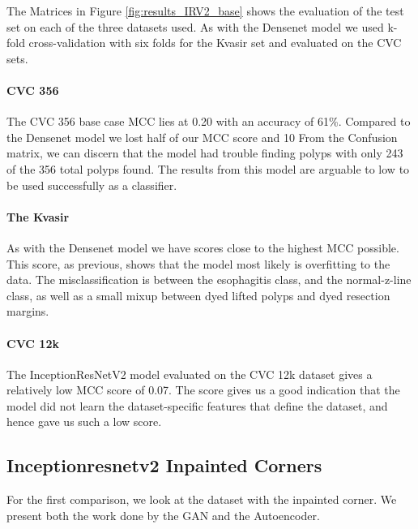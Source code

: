 \noindent
The Matrices in Figure \ref{fig:results_IRV2_base} shows the evaluation of the test set on each of the three datasets used. 
As with the Densenet model we used k-fold cross-validation with six folds for the Kvasir set and evaluated on the CVC sets.

\paragraph{CVC 356}
The CVC 356 base case MCC lies at 0.20 with an accuracy of 61\%.
Compared to the Densenet model we lost half of our MCC score and 10%
From the Confusion matrix, we can discern that the model had trouble finding polyps with only 243 of the 356 total polyps found. The results from this model are arguable to low to be used successfully as a classifier.

\paragraph{The Kvasir}
As with the Densenet model we have scores close to the highest MCC possible. This score, as previous, shows that the model most likely is overfitting to the data. 
The misclassification is between the esophagitis class, and the normal-z-line class, as well as a small mixup between dyed lifted polyps and dyed resection margins. 


\paragraph{CVC 12k}
The InceptionResNetV2 model evaluated on the CVC 12k dataset gives a relatively low MCC score of 0.07. The score gives us a good indication that the model did not learn the dataset-specific features that define the dataset, and hence gave us such a low score.


\FloatBarrier
\subsection{Inceptionresnetv2 Inpainted Corners}
For the first comparison, we look at the dataset with the inpainted corner. We present both the work done by the GAN and the Autoencoder. 

